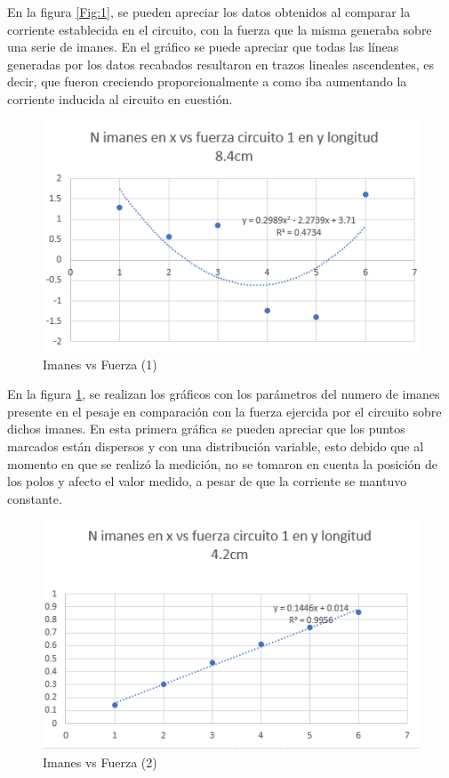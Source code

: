 \documentclass{article}
\begin{document}
En la figura \ref{Fig:1}, se pueden apreciar los datos obtenidos al comparar la corriente establecida en el circuito, con la fuerza que la misma generaba sobre una serie de imanes. En el gráfico se puede apreciar que todas las líneas generadas por los datos recabados resultaron en trazos lineales ascendentes, es decir, que fueron creciendo proporcionalmente a como iba aumentando la corriente inducida al circuito en cuestión.
\begin{figure}[H]
   \centering
   \includegraphics[scale=0.6]{../imgs/o1.png}
   \caption{Imanes vs Fuerza (1)}
   \label{Fig:2}
\end{figure}

En la figura \ref{Fig:2}, se realizan los gráficos con los parámetros del numero de imanes presente en el pesaje en comparación con la fuerza ejercida por el circuito sobre dichos imanes. En esta primera gráfica se pueden apreciar que los puntos marcados están dispersos y con una distribución variable, esto debido que al momento en que se realizó la medición, no se tomaron en cuenta la posición de los polos y afecto el valor medido, a pesar de que la corriente se mantuvo constante.

\begin{figure}[H]
   \centering
   \includegraphics[scale=0.6]{../imgs/o2.png}
   \caption{Imanes vs Fuerza (2)}
   \label{Fig:3}
\end{figure}
\end{document}
